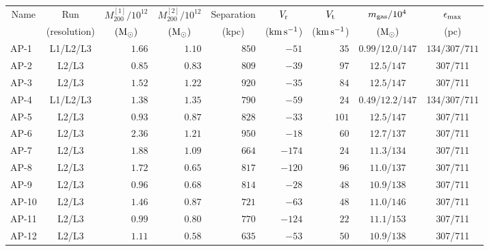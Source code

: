 \begin {tabular}{lcrrrrrcc}
\hline 
\multicolumn{1}{c}{Name} &
\multicolumn{1}{c}{Run} &
\multicolumn{1}{c}{$M_{200}^{[1]}/10^{12}$} &
\multicolumn{1}{c}{$M_{200}^{[2]}/10^{12}$} &
\multicolumn{1}{c}{Separation} &
\multicolumn{1}{c}{$V_{\rm r}$} &
\multicolumn{1}{c}{$V_{\rm t}$} &
\multicolumn{1}{c}{$m_{\rm gas}/10^4$} &
\multicolumn{1}{c}{$\epsilon_{\rm {max}}$} \\
&
\multicolumn{1}{c}{(resolution)} &
\multicolumn{1}{c}{$({\hbox{${\rm M}_\odot$}})$} &
\multicolumn{1}{c}{$({\hbox{${\rm M}_\odot$}})$} &
\multicolumn{1}{c}{(kpc)} &
\multicolumn{1}{c}{(${\rm km}\,{\rm s}^{-1}$)} &
\multicolumn{1}{c}{(${\rm km}\,{\rm s}^{-1}$)} &
\multicolumn{1}{c}{$({\hbox{${\rm M}_\odot$}})$} &
\multicolumn{1}{c}{(pc)} \\  
\hline
AP-1  &  L1/L2/L3   & $1.66$  &   $1.10$  &  $850$   &   $-51$   & $35$  & $0.99$/$12.0$/$147$ &  $134/307/711$ \\
AP-2  &  L2/L3   & $0.85$ & $0.83$   &  $809$   &   $-39$   & $97$  & $12.5$/$147$ &  307/711    \\
AP-3  &  L2/L3   & $1.52$  &   $1.22$  &  $920$   &   $-35$   & $84$  & $12.5$/$147$ &  307/711     \\
AP-4  &  L1/L2/L3   & $1.38$  &   $1.35$  &  $790$   &   $-59$   & $24$  & $0.49$/$12.2$/$147$ & 134/307/711  \\
AP-5  &  L2/L3   & $0.93$ &   $0.87$ &  $828$   &   $-33$   & $101$ & $12.5$/$147$ &  307/711 \\
AP-6  &  L2/L3   & $2.36$  &   $1.21$  &  $950$   &   $-18$   & $60$  & $12.7$/$137$ &  307/711 \\
AP-7  &  L2/L3   & $1.88$  &   $1.09$  &  $664$   &   $-174$  & $24$  & $11.3$/$134$ &  307/711 \\
AP-8  &  L2/L3   & $1.72$  &  $0.65$  &  $817$   &   $-120$  & $96$  & $11.0$/$137$ &  307/711 \\
AP-9  &  L2/L3   & $0.96$ &  $0.68$  &  $814$   &   $-28$   & $48$  & $10.9$/$138$ &  307/711 \\
AP-10 &  L2/L3   & $1.46$  &   $0.87$ &  $721$   &   $-63$   & $48$  & $11.0$/$146$ &  307/711 \\
AP-11 &  L2/L3   & $0.99$ &   $0.80$ &  $770$   &   $-124$  & $22$  & $11.1$/$153$ &  307/711 \\
AP-12 &  L2/L3   & $1.11$  &  $0.58$  &  $635$   &   $-53$   & $50$  & $10.9$/$138$ &  307/711 \\
\hline
\end{tabular}
